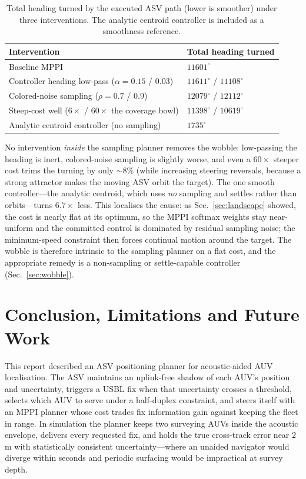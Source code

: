 \documentclass[12pt,a4paper,oneside]{book}
\newcommand{\secref}[1]{Sec.~\ref{#1}}
\begin{document}
\begin{table}[H]
\centering
\caption{Total heading turned by the executed ASV path (lower is smoother) under three interventions. The
analytic centroid controller is included as a smoothness reference.}
\label{tab:wobble}
\begin{tabular}{@{}ll@{}}
\toprule
Intervention & Total heading turned \\
\midrule
Baseline MPPI & $11601^{\circ}$ \\
Controller heading low-pass ($\alpha=0.15$ / $0.03$) & $11611^{\circ}$ / $11108^{\circ}$ \\
Colored-noise sampling ($\rho=0.7$ / $0.9$) & $12079^{\circ}$ / $12112^{\circ}$ \\
Steep-cost well ($6\times$ / $60\times$ the coverage bowl) & $11398^{\circ}$ / $10619^{\circ}$ \\
Analytic centroid controller (no sampling) & $1735^{\circ}$ \\
\bottomrule
\end{tabular}
\end{table}

\noindent No intervention \emph{inside} the sampling planner removes the wobble: low-passing the heading is
inert, colored-noise sampling is slightly worse, and even a $60\times$ steeper cost trims the turning by only
$\sim8\%$ (while increasing steering reversals, because a strong attractor makes the moving ASV orbit the
target). The one smooth controller---the analytic centroid, which uses \emph{no} sampling and settles rather
than orbits---turns $6.7\times$ less. This localises the cause: as \secref{sec:landscape} showed, the cost is
nearly flat at its optimum, so the MPPI softmax weights stay near-uniform and the committed control is
dominated by residual sampling noise; the minimum-speed constraint then forces continual motion around the
target. The wobble is therefore intrinsic to the sampling planner on a flat cost, and the appropriate remedy
is a non-sampling or settle-capable controller (\secref{sec:wobble}).

\chapter{Conclusion, Limitations and Future Work}
\label{ch:conclusion}

This report described an ASV positioning planner for acoustic-aided AUV localisation. The ASV maintains an
uplink-free shadow of each AUV's position and uncertainty, triggers a USBL fix when that uncertainty crosses
a threshold, selects which AUV to serve under a half-duplex constraint, and steers itself with an MPPI
planner whose cost trades fix information gain against keeping the fleet in range. In simulation the planner
keeps two surveying AUVs inside the acoustic envelope, delivers every requested fix, and holds the true
cross-track error near $2$\,m with statistically consistent uncertainty---where an unaided navigator would
diverge within seconds and periodic surfacing would be impractical at survey depth.
\end{document}
